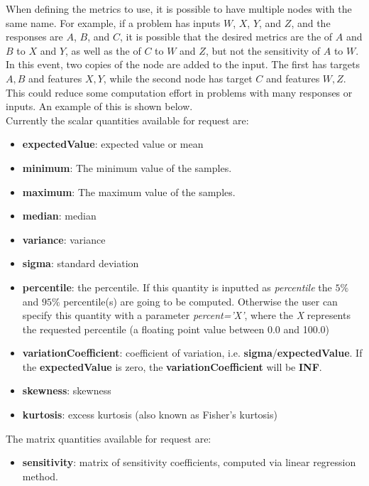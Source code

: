\begin{itemize}
    \nb When defining the metrics to use, it is possible to have multiple nodes with the same name.  For
    example, if a problem has inputs $W$, $X$, $Y$, and $Z$, and the responses are $A$, $B$, and $C$, it is possible that
    the desired metrics are the  of $A$ and $B$ to $X$ and $Y$, as well as the
     of $C$ to $W$ and $Z$, but not the sensitivity of $A$ to $W$.   In this event, two
    copies of the  node are added to the input.  The first has targets $A,B$ and features
    $X,Y$, while the second node has target $C$ and features $W,Z$.  This could reduce some computation effort
    in problems with many responses or inputs.  An example of this is shown below.
  \\ Currently the scalar quantities available for request are:
  \begin{itemize}
    \item \textbf{expectedValue}: expected value or mean
    \item \textbf{minimum}: The minimum value of the samples.
    \item \textbf{maximum}: The maximum value of the samples.
    \item \textbf{median}: median
    \item \textbf{variance}: variance
    \item \textbf{sigma}: standard deviation
    \item \textbf{percentile}: the percentile. If this quantity is inputted as \textit{percentile} the $5\%$ and $95\%$ percentile(s) are going to be computed.
                               Otherwise the user can specify this quantity with a parameter \textit{percent='X'}, where the \textit{X} represents the requested
                               percentile (a floating point value between 0.0 and 100.0)
    \item \textbf{variationCoefficient}: coefficient of variation, i.e. \textbf{sigma}/\textbf{expectedValue}. \nb If the \textbf{expectedValue} is zero,
    the \textbf{variationCoefficient} will be \textbf{INF}.
    \item \textbf{skewness}: skewness
    \item \textbf{kurtosis}: excess kurtosis (also known as Fisher's kurtosis)
  \end{itemize}
  The matrix quantities available for request are:
  \begin{itemize}
    \item \textbf{sensitivity}: matrix of sensitivity coefficients, computed via linear regression method.

\end{itemize}
\end{itemize}
